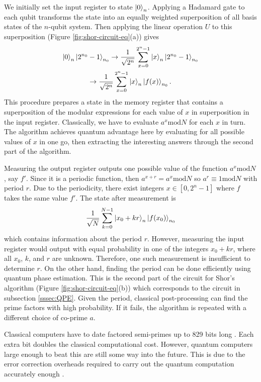 \documentclass[10pt]{iopart}
\begin{document}
We initially set the input register to state $\ket{0}_n$. Applying a Hadamard gate to each qubit transforms the state into an equally weighted superposition of all basis states of the $n$-qubit system. Then applying the linear operation $U$ to this superposition (Figure \ref{fig:shor-circuit-eq}(a)) gives
\begin{gather}
\ket{0}_n \ket{2^{n_0}-1}_{n_0} \to
\frac{1}{\sqrt{2^n}} \sum_{x=0}^{2^n-1} \ket{x}_n \ket{2^{n_0}-1}_{n_0} \nonumber\\ 
\to
\frac{1}{\sqrt{2^n}} \sum_{x=0}^{2^n-1} \ket{x}_n \ket{f(x)}_{n_0}.
\end{gather}
This procedure prepares a state in the memory register that contains a superposition of the modular expressions for each value of $x$ in superposition in the input register.  Classically, we have to evaluate $a^x\text{mod}N$ for each $x$ in turn. The algorithm achieves quantum advantage here by evaluating for all possible values of $x$ in one go, then extracting the interesting answers through the second part of the algorithm.

Measuring the output register outputs one possible value of the function $a^x\text{mod}N$, say $f'$. Since it is a periodic function, then $a^{x+r} = a^x\text{mod}N$ so $a^r \equiv 1\text{mod}N$ with period $r$. Due to the periodicity, there exist integers $x \in [0,2^n-1]$ where $f$ takes the same value $f'$. The state after measurement is
\begin{equation}
\frac{1}{\sqrt{N}} \sum_{k=0}^{N-1} \ket{x_0+kr}_n \ket{f(x_0)}_{n_0}
\end{equation}
which contains information about the period $r$. However, measuring the input register would output with equal probability in one of the integers $x_0+kr$, where all $x_0$, $k$, and $r$ are unknown. Therefore, one such measurement is insufficient to determine $r$. On the other hand, finding the period can be done efficiently using quantum phase estimation. This is the second part of the circuit for Shor's algorithm (Figure \ref{fig:shor-circuit-eq}(b)) which corresponds to the circuit in subsection \ref{sssec:QPE}. Given the period, classical post-processing can find the prime factors with high probability. If it fails, the algorithm is repeated with a different choice of co-prime $a$.

Classical computers have to date factored semi-primes up to 829 bits long \cite{classicalfactoring}. Each extra bit doubles the classical computational cost. However, quantum computers large enough to beat this are still some way into the future. This is due to the error correction overheads required to carry out the quantum computation accurately enough \cite{vanMeter2016}.
\end{document}
